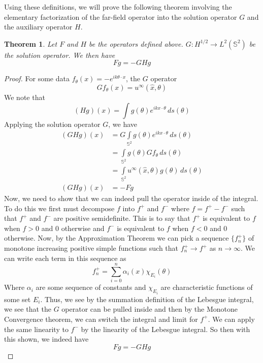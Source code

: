 \documentclass[]{article}
\newtheorem{theorem}{Theorem}
\begin{document}
				Using these definitions, we will prove the following theorem involving the elementary factorization of the far-field operator into the solution operator $G$ and the auxiliary operator $H$.
				\begin{theorem}
					Let $F$ and $H$ be the operators defined above. $G: H^{1/2} \to L^2(\mathbb S^2)$ be the solution operator. We then have 
					\begin{equation}
						Fg = -GHg
					\end{equation}
				\end{theorem}
				\begin{proof}
					For some data $f_\theta(x)= -e^{ik\theta \cdot x}$, the $G$ operator
					\begin{equation}
						Gf_\theta(x) = u^\infty(\hat x, \theta)
					\end{equation}
					We note that 
					\begin{equation}
						(Hg)(x) = \int g(\theta)e^{ikx\cdot \theta}\, ds(\theta) 
					\end{equation}
					Applying the solution operator $G$, we have 
					\begin{align}
						(GHg)(x) &= G\int\limits_{\mathbb S^2} g(\theta)e^{ikx\cdot \theta}\,ds(\theta)\\
						&= \int\limits_{\mathbb S^2} g(\theta)Gf_\theta\, ds(\theta)\\
						&=  \int\limits_{\mathbb S^2}u^\infty(\hat x, \theta)g(\theta)\, ds(\theta)\\
						(GHg)(x) &= -Fg
					\end{align}
					Now, we need to show that we can indeed pull the operator inside of the integral. To do this we first must decompose $f$ into $f^+$ and $f^-$ where $f = f^+-f^-$ such that $f^+$ and $f^-$ are positive semidefinite. This is to say that $f^+$ is equivalent to $f$ when $f>0$ and 0 otherwise and $f^-$ is equivalent to $f$ when $f<0$ and 0 otherwise. Now, by the Approximation Theorem we can pick a sequence $\{f^+_{n}\}$ of monotone increasing positive simple functions such that $f^+_{n}\to f^+$ as $n \to \infty$. We can write each term in this sequence as 
					\begin{equation}
						f^+_{n} = \sum^n_{i=0}\alpha_i(x)\chi_{E_i}(\theta)
					\end{equation} 
					Where $\alpha_i$ are some sequence of constants and $\chi_{E_i}$ are characteristic functions of some set $E_i$. Thus, we see by the summation definition of the Lebesgue integral, we see that the $G$ operator can be pulled inside and then by the Monotone Convergence theorem, we can switch the integral and limit for $f^+$. We can apply the same linearity to $f^-$ by the linearity of the Lebesgue integral. So then with this shown, we indeed have 
					\begin{equation}
						Fg = -GHg 
					\end{equation}
				\end{proof}
\end{document}
